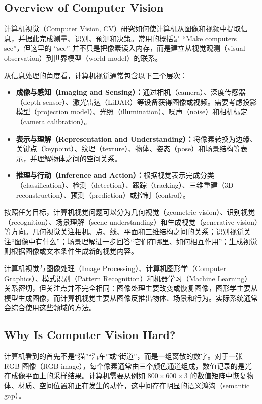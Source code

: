 \subsection{Overview of Computer Vision}

计算机视觉（Computer Vision, CV）研究如何使计算机从图像和视频中提取信息，并据此完成测量、识别、预测和决策。常用的概括是 ``Make computers see''，但这里的 ``see'' 并不只是把像素读入内存，而是建立从视觉观测（visual observation）到世界模型（world model）的联系。

从信息处理的角度看，计算机视觉通常包含以下三个层次：

\begin{itemize}
    \item \textbf{成像与感知（Imaging and Sensing）：}通过相机（camera）、深度传感器（depth sensor）、激光雷达（LiDAR）等设备获得图像或视频。需要考虑投影模型（projection model）、光照（illumination）、噪声（noise）和相机标定（camera calibration）。
    \item \textbf{表示与理解（Representation and Understanding）：}将像素转换为边缘、关键点（keypoint）、纹理（texture）、物体、姿态（pose）和场景结构等表示，并理解物体之间的空间关系。
    \item \textbf{推理与行动（Inference and Action）：}根据视觉表示完成分类（classification）、检测（detection）、跟踪（tracking）、三维重建（3D reconstruction）、预测（prediction）或控制（control）。
\end{itemize}

按照任务目标，计算机视觉问题可以分为几何视觉（geometric vision）、识别视觉（recognition）、场景理解（scene understanding）和生成视觉（generative vision）等方向。几何视觉关注相机、点、线、平面和三维结构之间的关系；识别视觉关注“图像中有什么”；场景理解进一步回答“它们在哪里、如何相互作用”；生成视觉则根据图像或文本条件生成新的视觉内容。

计算机视觉与图像处理（Image Processing）、计算机图形学（Computer Graphics）、模式识别（Pattern Recognition）和机器学习（Machine Learning）关系密切，但关注点并不完全相同：图像处理主要改变或恢复图像，图形学主要从模型生成图像，而计算机视觉主要从图像反推出物体、场景和行为。实际系统通常会综合使用这些领域的方法。

\subsection{Why Is Computer Vision Hard?}

计算机看到的首先不是“猫”“汽车”或“街道”，而是一组离散的数字。对于一张 RGB 图像（RGB image），每个像素通常由三个颜色通道组成，数值记录的是光在成像平面上的采样结果。计算机需要从例如 $800\times600\times3$ 的数值矩阵中恢复物体、材质、空间位置和正在发生的动作，这中间存在明显的语义鸿沟（semantic gap）。

